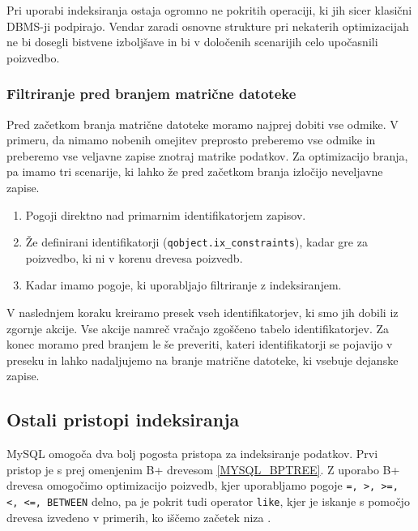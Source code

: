 \documentclass[a4paper,12pt,openright]{book}
\begin{document}
        \noindent
        Pri uporabi indeksiranja ostaja ogromno ne pokritih operaciji, ki jih sicer klasični DBMS-ji podpirajo. Vendar zaradi osnovne strukture pri nekaterih optimizacijah ne bi dosegli bistvene izboljšave in bi v določenih scenarijih celo upočasnili poizvedbo.

        \subsubsection{Filtriranje pred branjem matrične datoteke}

        Pred začetkom branja matrične datoteke moramo najprej dobiti vse odmike. V primeru, da nimamo nobenih omejitev preprosto preberemo vse odmike in preberemo vse veljavne zapise znotraj matrike podatkov. Za optimizacijo branja, pa imamo tri scenarije, ki lahko že pred začetkom branja izločijo neveljavne zapise.

        \begin{enumerate}
            \item Pogoji direktno nad primarnim identifikatorjem zapisov.
            \item Že definirani identifikatorji ({\tt qobject.ix\_constraints}), kadar gre za poizvedbo, ki ni v korenu drevesa poizvedb.
            \item Kadar imamo pogoje, ki uporabljajo filtriranje z indeksiranjem.
        \end{enumerate}

        \noindent
        V naslednjem koraku kreiramo presek vseh identifikatorjev, ki smo jih dobili iz zgornje akcije. Vse akcije namreč vračajo zgoščeno tabelo identifikatorjev. Za konec moramo pred branjem le še preveriti, kateri identifikatorji se pojavijo v preseku in lahko nadaljujemo na branje matrične datoteke, ki vsebuje dejanske zapise.


        \subsection{Ostali pristopi indeksiranja}

        MySQL omogoča dva bolj pogosta pristopa za indeksiranje podatkov. Prvi pristop je s prej omenjenim B+ drevesom \ref{MYSQL_BPTREE}. Z uporabo B+ drevesa omogočimo optimizacijo poizvedb, kjer uporabljamo pogoje {\tt =, >, >=, <, <=, BETWEEN} delno, pa je pokrit tudi operator {\tt like}, kjer je iskanje s pomočjo drevesa izvedeno v primerih, ko iščemo začetek niza \cite{TREE_HASH_MYSQL}.
\end{document}
